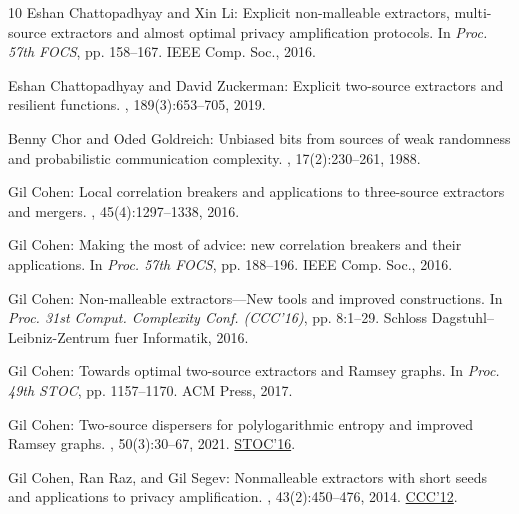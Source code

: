 \begin{thebibliography}{10}
{\sc Eshan Chattopadhyay and Xin Li}: Explicit non-malleable extractors,
  multi-source extractors and almost optimal privacy amplification protocols.
\newblock In {\em Proc. 57th FOCS}, pp. 158--167. IEEE Comp. Soc., 2016.

{\sc Eshan Chattopadhyay and David Zuckerman}: Explicit two-source extractors
  and resilient functions.
, 189(3):653--705, 2019.

{\sc Benny Chor and Oded Goldreich}: Unbiased bits from sources of weak
  randomness and probabilistic communication complexity.
, 17(2):230--261, 1988.
\newblock [\epfmtdoi{10.1137/0217015}]

{\sc Gil Cohen}: Local correlation breakers and applications to three-source
  extractors and mergers.
, 45(4):1297--1338, 2016.
\newblock [\epfmtdoi{10.1137/15M1029837}]

{\sc Gil Cohen}: Making the most of advice: new correlation breakers and their
  applications.
\newblock In {\em Proc. 57th FOCS}, pp. 188--196. IEEE Comp. Soc., 2016.

{\sc Gil Cohen}: Non-malleable extractors---{N}ew tools and improved
  constructions.
\newblock In {\em Proc. 31st Comput. Complexity Conf. (CCC'16)}, pp. 8:1--29.
  Schloss Dagstuhl--Leibniz-Zentrum fuer Informatik, 2016.

{\sc Gil Cohen}: Towards optimal two-source extractors and {R}amsey graphs.
\newblock In {\em Proc. 49th STOC}, pp. 1157--1170. ACM Press, 2017.
\newblock [\epfmtdoi{10.1145/3055399.3055429}]

{\sc Gil Cohen}: Two-source dispersers for polylogarithmic entropy and improved
  {R}amsey graphs.
, 50(3):30--67, 2021.
\newblock \prelim \href{https://doi.org/10.1145/2897518.2897530}{STOC'16}.
\newblock [\epfmtdoi{10.1137/16M1096219}]

{\sc Gil Cohen, Ran Raz, and Gil Segev}: Nonmalleable extractors with short
  seeds and applications to privacy amplification.
, 43(2):450--476, 2014.
\newblock \prelim \href{https://doi.org/10.1109/CCC.2012.21}{CCC'12}.
\newblock [\epfmtdoi{10.1137/130908634}]


\end{thebibliography}
